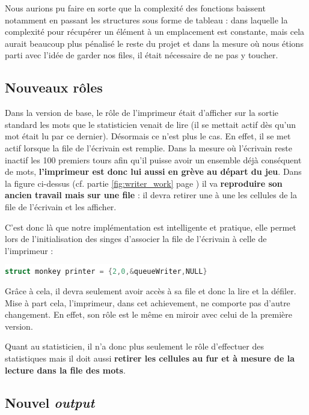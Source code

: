 \documentclass{article}
\newcommand{\inlinecode}[2]{\colorbox{white}{\lstinline[language=#1]$#2$}}
\begin{document}
Nous aurions pu faire en sorte que la complexité des fonctions baissent notamment en passant les structures sous forme de tableau : dans laquelle la complexité pour récupérer un élément à un emplacement est constante, mais cela aurait beaucoup plus pénalisé le reste du projet et dans la mesure où nous étions parti avec l'idée de garder nos files, il était nécessaire de ne pas y toucher.


\subsection{Nouveaux rôles}
\label{subsct:nouveaux_roles}

\label{imprimeur_achiev1}
Dans la version de base, le rôle de l'imprimeur était d'afficher sur la sortie standard les mots que le statisticien venait de lire (il se mettait actif dès qu'un mot était lu par ce dernier). Désormais ce n'est plus le cas. En effet, il se met actif lorsque la file de l'écrivain est remplie. Dans la mesure où l'écrivain reste inactif les 100 premiers tours afin qu'il puisse avoir un ensemble déjà conséquent de mots, \textbf{l'imprimeur est donc lui aussi en grève au départ du jeu}. Dans la figure ci-dessus (cf. partie \ref{fig:writer_work} page \pageref{fig:writer_work}) il va \textbf{reproduire son ancien travail mais sur une file } : il devra retirer une à une les cellules de la file de l'écrivain et les afficher.

\label{stats_achiev1}
C'est donc là que notre implémentation est intelligente et pratique, elle permet lors de l'initialisation des singes d'associer la file de l'écrivain à celle de l'imprimeur :

\inlinecode{C}{struct monkey printer = {2,0,&queueWriter,NULL}}
\label{lst:printer_init}

Grâce à cela, il devra seulement avoir accès à sa file et donc la lire et la défiler. Mise à part cela, l'imprimeur, dans cet achievement, ne comporte pas d'autre changement. En effet, son rôle est le même en miroir avec celui de la première version.

Quant au statisticien, il n'a donc plus seulement le rôle d'effectuer des statistiques mais il doit aussi \textbf{retirer les cellules au fur et à mesure de la lecture dans la file des mots}.


\subsection{Nouvel \textit{output}}
\label{subsct:nouvel_output}
\end{document}
